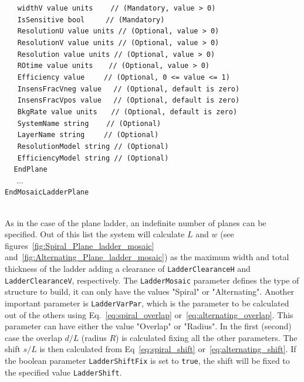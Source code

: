 $~~~~~~~${\tt widthV           value units                     $~~~~~$   // (Mandatory, value > 0)} \\
$~~~~~~~${\tt IsSensitive      bool                          $~~~~~~~$   // (Mandatory)} \\
$~~~~~~~${\tt ResolutionU      value units                               // (Optional, value > 0)} \\
$~~~~~~~${\tt ResolutionV      value units                               // (Optional, value > 0)} \\
$~~~~~~~${\tt Resolution       value units                               // (Optional, value > 0)} \\
$~~~~~~~${\tt ROtime           value units                      $~~~~$   // (Optional, value > 0)} \\
$~~~~~~~${\tt Efficiency       value                          $~~~~~~$   // (Optional, 0 <= value <= 1)} \\
$~~~~~~~${\tt InsensFracVneg   value                              $~~$   // (Optional, default is zero)} \\
$~~~~~~~${\tt InsensFracVpos   value                              $~~$   // (Optional, default is zero)} \\
$~~~~~~~${\tt BkgRate          value units                       $~~~$   // (Optional, default is zero)} \\
$~~~~~~~${\tt SystemName       string                          $~~~~~$   // (Optional)} \\
$~~~~~~~${\tt LayerName        string                         $~~~~~~$   // (Optional)} \\
$~~~~~~~${\tt ResolutionModel  string                                    // (Optional)} \\
$~~~~~~~${\tt EfficiencyModel  string                                    // (Optional)} \\
$~~~~~${\tt EndPlane} \\
$~~~~~$ ... \\
{\tt EndMosaicLadderPlane}

~\\
As in the case of the plane ladder, an indefinite number of planes can be specified. Out of this list the system
will calculate $L$ and $w$ (see figures~\ref{fig:Spiral_Plane_ladder_mosaic} and~\ref{fig:Alternating_Plane_ladder_mosaic}) 
as the maximum width and total thickness of the ladder adding a clearance of {\tt LadderClearanceH} and {\tt LadderClearanceV}, 
respectively. The {\tt LadderMosaic} parameter defines the type of structure to build, it can only have the values "Spiral" or 
"Alternating". Another important parameter is {\tt LadderVarPar}, which is the parameter to be calculated out of the others using 
Eq.~\ref{eq:spiral_overlap} or~\ref{eq:alternating_overlap}. This parameter can have either the value "Overlap" or "Radius". 
In the first (second) case the overlap $d/L$ (radius $R$) is calculated fixing all the other parameters. The shift $s/L$ is 
then calculated from Eq~\ref{eq:spiral_shift} or~\ref{eq:alternating_shift}. If the boolean parameter {\tt LadderShiftFix} is set 
to {\tt true}, the shift will be fixed to the specified value {\tt LadderShift}.

